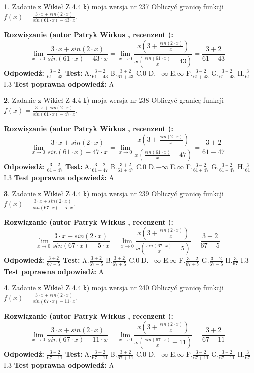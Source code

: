 \documentclass[12pt, a4paper]{article}
\theoremstyle{definition} %
\newtheorem{zad}{}
\newcommand{\zadStart}[1]{\begin{zad}#1\newline}
\newcommand{\zadStop}{\end{zad}}
\newcommand{\rozwStart}[2]{\noindent \textbf{Rozwiązanie (autor #1 , recenzent #2): }\newline}
\newcommand{\rozwStop}{\newline}
\newcommand{\odpStart}{\noindent \textbf{Odpowiedź:}\newline}
\newcommand{\odpStop}{\newline}
\newcommand{\testStart}{\noindent \textbf{Test:}\newline}
\newcommand{\testStop}{\newline}
\newcommand{\kluczStart}{\noindent \textbf{Test poprawna odpowiedź:}\newline}
\newcommand{\kluczStop}{\newline}
\begin{document}
\zadStart{Zadanie z Wikieł Z 4.4 k) moja wersja nr 237}
Obliczyć granicę funkcji $f(x)=\frac{3\cdot x +sin(2\cdot x)}{sin(61\cdot x) -43\cdot x}$.
\zadStop
\rozwStart{Patryk Wirkus}{}
$$\lim\limits_{x\to 0}\frac{3\cdot x +sin(2\cdot x)}{sin(61\cdot x) -43\cdot x}
=\lim\limits_{x\to 0}\frac{x(3+\frac{sin(2\cdot x)}{x})}{x(\frac{sin(61\cdot x)}{x}-43)}
=\frac{3+2}{61-43}$$
\rozwStop
\odpStart
$\frac{3+2}{61-43}$
\odpStop
\testStart
A.$\frac{3+2}{61-43}$
B.$\frac{3+2}{61+43}$
C.$0$
D.$-\infty$
E.$\infty$
F.$\frac{3-2}{61+43}$
G.$\frac{3-2}{61-43}$
H.$\frac{3}{61}$
I.$3$
\testStop
\kluczStart
A
\kluczStop



\zadStart{Zadanie z Wikieł Z 4.4 k) moja wersja nr 238}
Obliczyć granicę funkcji $f(x)=\frac{3\cdot x +sin(2\cdot x)}{sin(61\cdot x) -47\cdot x}$.
\zadStop
\rozwStart{Patryk Wirkus}{}
$$\lim\limits_{x\to 0}\frac{3\cdot x +sin(2\cdot x)}{sin(61\cdot x) -47\cdot x}
=\lim\limits_{x\to 0}\frac{x(3+\frac{sin(2\cdot x)}{x})}{x(\frac{sin(61\cdot x)}{x}-47)}
=\frac{3+2}{61-47}$$
\rozwStop
\odpStart
$\frac{3+2}{61-47}$
\odpStop
\testStart
A.$\frac{3+2}{61-47}$
B.$\frac{3+2}{61+47}$
C.$0$
D.$-\infty$
E.$\infty$
F.$\frac{3-2}{61+47}$
G.$\frac{3-2}{61-47}$
H.$\frac{3}{61}$
I.$3$
\testStop
\kluczStart
A
\kluczStop



\zadStart{Zadanie z Wikieł Z 4.4 k) moja wersja nr 239}
Obliczyć granicę funkcji $f(x)=\frac{3\cdot x +sin(2\cdot x)}{sin(67\cdot x) -5\cdot x}$.
\zadStop
\rozwStart{Patryk Wirkus}{}
$$\lim\limits_{x\to 0}\frac{3\cdot x +sin(2\cdot x)}{sin(67\cdot x) -5\cdot x}
=\lim\limits_{x\to 0}\frac{x(3+\frac{sin(2\cdot x)}{x})}{x(\frac{sin(67\cdot x)}{x}-5)}
=\frac{3+2}{67-5}$$
\rozwStop
\odpStart
$\frac{3+2}{67-5}$
\odpStop
\testStart
A.$\frac{3+2}{67-5}$
B.$\frac{3+2}{67+5}$
C.$0$
D.$-\infty$
E.$\infty$
F.$\frac{3-2}{67+5}$
G.$\frac{3-2}{67-5}$
H.$\frac{3}{67}$
I.$3$
\testStop
\kluczStart
A
\kluczStop



\zadStart{Zadanie z Wikieł Z 4.4 k) moja wersja nr 240}
Obliczyć granicę funkcji $f(x)=\frac{3\cdot x +sin(2\cdot x)}{sin(67\cdot x) -11\cdot x}$.
\zadStop
\rozwStart{Patryk Wirkus}{}
$$\lim\limits_{x\to 0}\frac{3\cdot x +sin(2\cdot x)}{sin(67\cdot x) -11\cdot x}
=\lim\limits_{x\to 0}\frac{x(3+\frac{sin(2\cdot x)}{x})}{x(\frac{sin(67\cdot x)}{x}-11)}
=\frac{3+2}{67-11}$$
\rozwStop
\odpStart
$\frac{3+2}{67-11}$
\odpStop
\testStart
A.$\frac{3+2}{67-11}$
B.$\frac{3+2}{67+11}$
C.$0$
D.$-\infty$
E.$\infty$
F.$\frac{3-2}{67+11}$
G.$\frac{3-2}{67-11}$
H.$\frac{3}{67}$
I.$3$
\testStop
\kluczStart
A
\kluczStop
\end{document}
